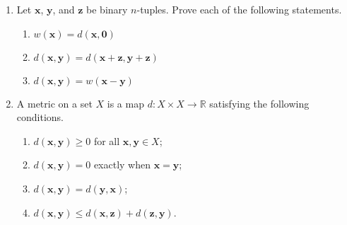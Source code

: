 {\begin{enumerate}
\begin{minipage}[t]{4.6in}
\begin{minipage}[t]{2.25in}
\begin{itemize}
 \item[{\bf (d)}]
 
\end{itemize}
\end{minipage}
\end{minipage}
 
\vspace{4pt}        %
 
 
 
 
 
\item
Let ${\mathbf x}$, ${\mathbf y}$, and ${\mathbf z}$ be binary $n$-tuples.
Prove each of the following statements. 
\begin{enumerate}
 
 \item
$w({\mathbf x}) = d( {\mathbf x}, {\mathbf 0})$
 
 \item
$d( {\mathbf x}, {\mathbf y}) = d( {\mathbf x} + {\mathbf z}, {\mathbf
y} + {\mathbf z} )$
 
 \item
$d({\mathbf x}, {\mathbf y}) = w({\mathbf x}- {\mathbf y})$
 
\end{enumerate}
 
 
\item
A {\bfi metric\/} on a set $X$ is a map $d: X \times X
\rightarrow {\mathbb R}$ satisfying the following conditions. 
\begin{enumerate}
 
 \item
$d( {\mathbf x}, {\mathbf y}) \geq 0$ for all ${\mathbf x}, {\mathbf y} \in
X$; 
 
 \item
$d( {\mathbf x}, {\mathbf y}) = 0$ exactly when ${\mathbf x} = {\mathbf y}$; 
 
 \item
$d( {\mathbf x}, {\mathbf y})= d( {\mathbf y}, {\mathbf x})$;
 
 \item
$d( {\mathbf x}, {\mathbf y}) \leq d( {\mathbf x}, {\mathbf z}) + d( {\mathbf
z}, {\mathbf y})$. 
 

\end{enumerate}
\end{enumerate}}
